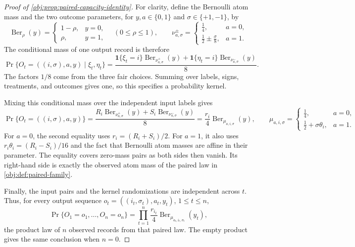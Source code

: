 \begin{proof}[Proof of \cref{obj:prop:paired-capacity-identity}]
For clarity, define the Bernoulli atom mass and the two outcome parameters, for \(y,a\in\{0,1\}\) and \(\sigma\in\{+1,-1\}\), by
\[
\operatorname{Ber}_{\rho}(y)
=\begin{cases}1-\rho,&y=0,\\ \rho,&y=1,\end{cases}
\quad(0\leq\rho\leq1),
\qquad
\nu^\pm_{a,\sigma}
=\begin{cases}\frac14,&a=0,\\[2pt]\frac12\pm\frac{\sigma}{8},&a=1.\end{cases}
\]
The conditional mass of one output record is therefore
\[
\Pr\{O_t=((i,\sigma),a,y)\mid \xi_t,\eta_t\}
=\frac{
 \mathbf1\{\xi_t=i\}\operatorname{Ber}_{\nu^+_{a,\sigma}}(y)
+\mathbf1\{\eta_t=i\}\operatorname{Ber}_{\nu^-_{a,\sigma}}(y)
}{8}.
\] %
The factors \(1/8\) come from the three fair choices. Summing over labels, signs, treatments, and outcomes gives one, so this specifies a probability kernel.

Mixing this conditional mass over the independent input labels gives
\[
\Pr\{O_t=((i,\sigma),a,y)\}
=\frac{
 R_i\operatorname{Ber}_{\nu^+_{a,\sigma}}(y)
+S_i\operatorname{Ber}_{\nu^-_{a,\sigma}}(y)
}{8}
=\frac{r_i}{4}\operatorname{Ber}_{\mu_{a,i,\sigma}}(y),
\qquad
\mu_{a,i,\sigma}
=\begin{cases}\frac14,&a=0,\\[2pt]\frac12+\sigma\theta_i,&a=1.\end{cases}
\] %
For \(a=0\), the second equality uses \(r_i=(R_i+S_i)/2\). For \(a=1\), it also uses \(r_i\theta_i=(R_i-S_i)/16\) and the fact that Bernoulli atom masses are affine in their parameter. The equality covers zero-mass pairs as both sides then vanish. Its right-hand side is exactly the observed atom mass of the paired law in \cref{obj:def:paired-family}.

Finally, the input pairs and the kernel randomizations are independent across \(t\). Thus, for every output sequence \(o_t=((i_t,\sigma_t),a_t,y_t)\), \(1\leq t\leq n\),
\[
\Pr\{O_1=o_1,\ldots,O_n=o_n\}
=\prod_{t=1}^n
 \frac{r_{i_t}}4\operatorname{Ber}_{\mu_{a_t,i_t,\sigma_t}}(y_t),
\]
the product law of \(n\) observed records from that paired law. The empty product gives the same conclusion when \(n=0\). %
\end{proof}
